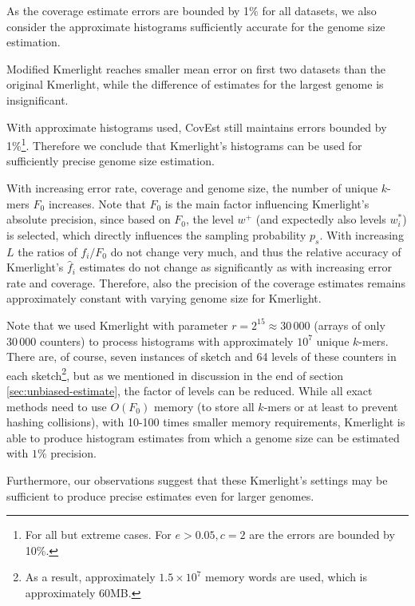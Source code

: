 As the coverage estimate errors are bounded by 1\% for all datasets, we also consider the
approximate histograms sufficiently accurate for the genome size estimation.

Modified Kmerlight reaches smaller mean error on first two datasets than the original Kmerlight,
while the difference of estimates for the largest genome is insignificant.

\medskip

With approximate histograms used, CovEst still maintains errors bounded by 1\%\footnote{For all but
extreme cases. For $e > 0.05, c = 2$ are the errors are bounded by 10\%.}. Therefore we conclude
that Kmerlight's histograms can be used for sufficiently precise genome size estimation. 

With increasing error rate, coverage and genome size, the number of unique $k$-mers $F_0$ increases.
Note that $F_0$ is the main factor influencing Kmerlight's absolute precision, since based on $F_0$,
the level $w^+$ (and expectedly also levels $w_i^*$) is selected, which directly influences the
sampling probability $p_s$. With increasing $L$ the ratios of $f_i/F_0$ do not change very much,
and thus the relative accuracy of Kmerlight's $\hat f_i$ estimates do not change as significantly
as with increasing error rate and coverage. Therefore, also the precision of the coverage estimates
remains approximately constant with varying genome size for Kmerlight.

Note that we used Kmerlight with parameter $r=2^{15} \approx 30\,000$ (arrays of only $30\,000$
counters) to process histograms with approximately $10^7$ unique $k$-mers.
There are, of course, seven instances of sketch and 64 levels of these counters in each 
sketch\footnote{As a result, approximately $1.5 \times 10^7$ memory words are used, which is approximately
60MB.}, but as we mentioned in discussion in the end of section \ref{sec:unbiased-estimate}, the
factor of levels can be reduced. While all exact methods need to use $O(F_0)$ memory 
(to store all $k$-mers or at least to prevent hashing collisions), with 10-100 times smaller 
memory requirements, Kmerlight is able to produce histogram estimates from which a genome 
size can be estimated with $1\%$ precision. 

Furthermore, our observations suggest that these Kmerlight's settings may be sufficient
to produce precise estimates even for larger genomes.

